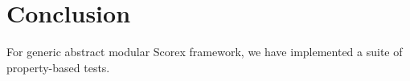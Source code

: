 
\section{Conclusion}

For generic abstract modular Scorex framework, we have implemented a suite of property-based tests.